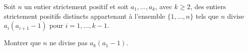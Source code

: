 Soit $n$ un entier strictement positif et soit $a_1, \ldots, a_k$, avec $k \geqslant 2$, des entiers
strictement positifs distincts appartenant à l'ensemble $\{1, \ldots, n\}$ tels que $n$ divise
$a_i(a_{i+1} - 1)$ pour $i = 1, \ldots, k - 1$.

Montrer que $n$ ne divise pas $a_k(a_1 - 1)$.
